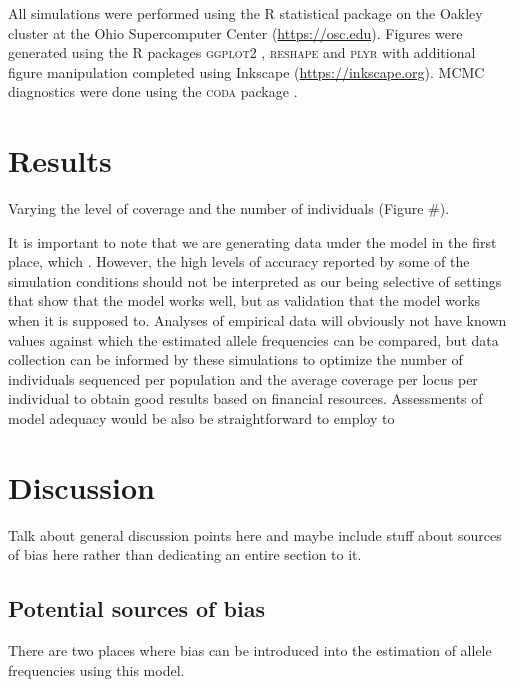 \documentclass[11pt,english,letterpaper,oneside]{article}
\begin{document}
All simulations were performed using the R statistical package \citep{r2014} on the Oakley cluster at the Ohio Supercomputer Center (\url{https://osc.edu}). Figures were generated using the R packages \textsc{ggplot2} \citep{wickham2009ggplot2}, \textsc{reshape} \citep{wickham2011plyr} and \textsc{plyr} \citep{wickham2007reshape} with additional figure manipulation completed using Inkscape (\url{https://inkscape.org}). MCMC diagnostics were done using the \textsc{coda} package \citep{plummer2006coda}.
\medskip

\section*{Results}             %

Varying the level of coverage and the number of individuals (Figure \#).
\medskip

It is important to note that we are generating data under the model in the first place, which . However, the high levels of accuracy reported by some of the simulation conditions should not be interpreted as our being selective of settings that show that the model works well, but as validation that the model works when it is supposed to. Analyses of empirical data will obviously not have known values against which the estimated allele frequencies can be compared, but data collection can be informed by these simulations to optimize the number of individuals sequenced per population and the average coverage per locus per individual to obtain good results based on financial resources. Assessments of model adequacy would be also be straightforward to employ to 
\medskip

\section*{Discussion}              %

Talk about general discussion points here and maybe include stuff about sources of bias here rather than dedicating an entire section to it.

\medskip
\subsection*{Potential sources of bias}
\medskip

There are two places where bias can be introduced into the estimation of allele frequencies using this model.
\medskip
\end{document}
